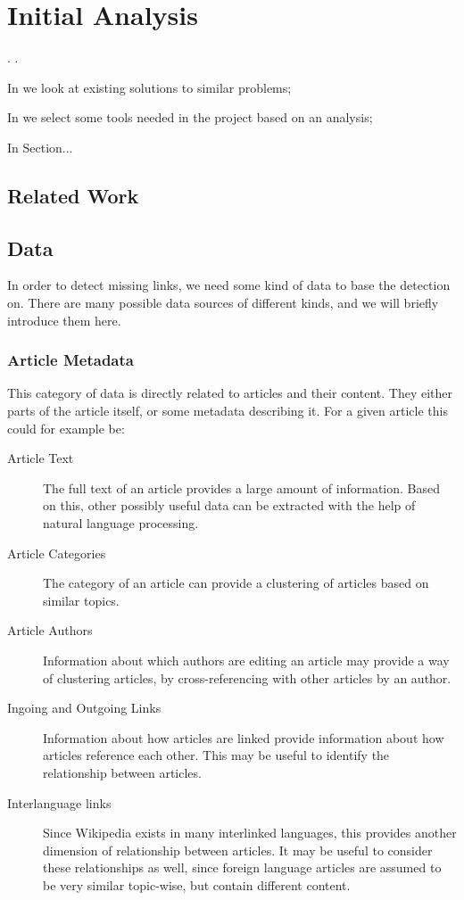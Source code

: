 \chapter{Initial Analysis}\label{chap:analysis}
\dummy . \dummy .

\begin{chapterorganization}
  \item In  we look at existing solutions to similar problems;
  \item In  we select some tools needed in the project based on an analysis;
  
  \item In Section...
\end{chapterorganization}


\section{Related Work}\label{sec:related_work}
\dummy

\section{Data}
In order to detect missing links, we need some kind of data to base the detection on. There are many possible data sources of different kinds, and we will briefly introduce them here.

\subsection{Article Metadata}
This category of data is directly related to articles and their content. They either parts of the article itself, or some metadata describing it. For a given article this could for example be:
\begin{description}
  \item[Article Text] The full text of an article provides a large amount of information. Based on this, other possibly useful data can be extracted with the help of natural language processing.
  \item[Article Categories] The category of an article can provide a clustering of articles based on similar topics.
  \item[Article Authors] Information about which authors are editing an article may provide a way of clustering articles, by cross-referencing with other articles by an author.
  \item[Ingoing and Outgoing Links] Information about how articles are linked provide information about how articles reference each other. This may be useful to identify the relationship between articles.
  \item[Interlanguage links] Since Wikipedia exists in many interlinked languages, this provides another dimension of relationship between articles. It may be useful to consider these relationships as well, since foreign language articles are assumed to be very similar topic-wise, but contain different content.
\end{description}

